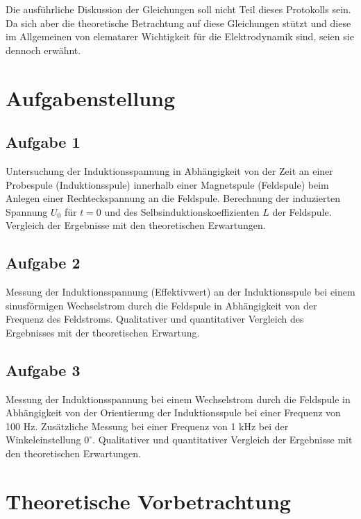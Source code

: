 \documentclass{article}
\begin{document}
\noindent
Die ausführliche Diskussion der Gleichungen soll nicht Teil dieses Protokolls sein. Da sich aber die theoretische Betrachtung auf diese Gleichungen stützt und diese im Allgemeinen von elematarer Wichtigkeit für die Elektrodynamik sind, seien sie dennoch erwähnt.

\section*{Aufgabenstellung}
\subsection*{Aufgabe 1}
Untersuchung der Induktionsspannung in Abhängigkeit von der Zeit an einer Probespule (Induktionsspule) innerhalb einer Magnetspule (Feldspule) beim Anlegen einer Rechteckspannung an die Feldspule. Berechnung der induzierten Spannung \(U_0\) für \(t=0\) und des Selbsinduktionskoeffizienten \(L\) der Feldspule. Vergleich der Ergebnisse mit den theoretischen Erwartungen.
\subsection*{Aufgabe 2}
Messung der Induktionsspannung (Effektivwert) an der Induktionsspule bei einem sinusförmigen Wechselstrom durch die Feldspule in Abhängigkeit von der Frequenz des Feldstroms. Qualitativer und quantitativer Vergleich des Ergebnisses mit der theoretischen Erwartung.
\subsection*{Aufgabe 3}
Messung der Induktionsspannung bei einem Wechselstrom durch die Feldspule in Abhängigkeit von der Orientierung der Induktionsspule bei einer Frequenz von 100 Hz. Zusätzliche Messung bei einer Frequenz von 1 kHz bei der Winkeleinstellung \(0^\circ \). Qualitativer und quantitativer Vergleich der Ergebnisse mit den theoretischen Erwartungen.

\section{Theoretische Vorbetrachtung}
\end{document}
